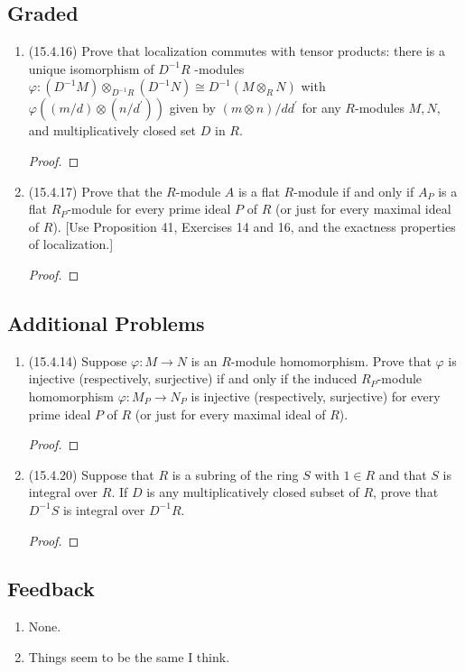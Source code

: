\documentclass[11pt]{article}
\begin{document}
\subsection*{Graded}
\begin{enumerate}
    \item (15.4.16) Prove that localization commutes with tensor products: there is a unique isomorphism of $D^{-1}R$ -modules $\varphi\colon (D^{-1}M)\otimes_{D^{-1}R} (D^{-1}N)\cong D^{-1}(M\otimes_R N)$ with $\varphi((m/d)\otimes(n/d^\prime))$ given by $(m\otimes n)/dd^\prime$ for any $R$-modules $M,N$, and multiplicatively closed set $D$ in $R$. \begin{proof}
        
    \end{proof}
    \item (15.4.17) Prove that the $R$-module $A$ is a flat $R$-module if and only if $A_P$ is a flat $R_P$-module for every prime ideal $P$ of $R$ (or just for every maximal ideal of $R$). [Use Proposition 41, Exercises 14 and 16, and the exactness properties of localization.] \begin{proof}
        
    \end{proof}
\end{enumerate}
\subsection*{Additional Problems}
\begin{enumerate}
    \item (15.4.14) Suppose $\varphi\colon M\to N$ is an $R$-module homomorphism. Prove that $\varphi$ is injective (respectively, surjective) if and only if the induced $R_P$-module homomorphism $\varphi\colon M_P\to N_P$ is injective (respectively, surjective) for every prime ideal $P$ of $R$ (or just for every maximal ideal of $R$). \begin{proof}
        
    \end{proof}
    \item (15.4.20) Suppose that $R$ is a subring of the ring $S$ with $1\in R$ and that $S$ is integral over $R$. If $D$ is any multiplicatively closed subset of $R$, prove that $D^{-1}S$ is integral over $D^{-1}R$. \begin{proof}
        
    \end{proof}
\end{enumerate}
\subsection*{Feedback}
\begin{enumerate}
    \item None.
    \item Things seem to be the same I think.
\end{enumerate}
\end{document}
